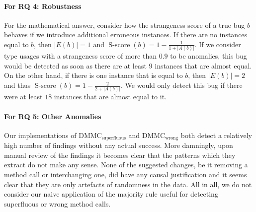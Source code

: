 \paragraph{For RQ 4: Robustness}


For the mathematical answer, consider how the strangeness score of a true bug $b$ behaves if we introduce additional erroneous instances.
If there are no instances equal to $b$, then $|E(b)|=1$ and $\operatorname{S-score}(b)=1-\frac{1}{1+|A(b)|}$.
If we consider type usages with a strangeness score of more than $0.9$ to be anomalies, this bug would be detected as soon as there are at least $9$ instances that are almost equal.
On the other hand, if there is one instance that is equal to $b$, then $|E(b)|=2$ and thus $\operatorname{S-score}(b)=1-\frac{2}{2+|A(b)|}$.
We would only detect this bug if there were at least $18$ instances that are almost equal to it.

\paragraph{For RQ 5: Other Anomalies}

Our implementations of $\text{DMMC}_\text{superfluous}$ and $\text{DMMC}_\text{wrong}$ both detect a relatively high number of findings without any actual success.
More damningly, upon manual review of the findings it becomes clear that the patterns which they extract do not make any sense.
None of the suggested changes, be it removing a method call or interchanging one, did have any causal justification and it seems clear that they are only artefacts of randomness in the data.
All in all, we do not consider our naive application of the majority rule useful for detecting superfluous or wrong method calls.

